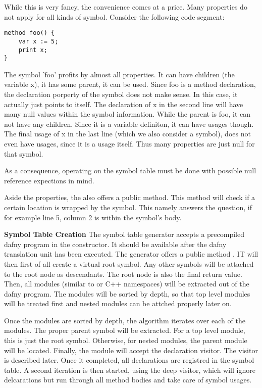 While this is very fancy, the convenience comes at a price. Many properties do not apply for all kinds of symbol. Consider the following code segment:

\begin{lstlisting}[language=dafny, caption={Example Code Regarding Symbol Information}, captionpos=b, label={lst:aldbkajds}]
method foo() {
    var x := 5;
    print x;
}
\end{lstlisting}

The symbol 'foo' profits by almost all properties. It can have children (the variable x), it has some parent, it can be used. Since foo is a method declaration, the declaration porperty of the symbol does not make sense. In this case, it actually just points to itself. The declaration of x in the second line will have many null values within the symbol information. While the parent is foo, it can not have any children. Since it is a variable definiton, it can have usages though. The final usage of x in the last line (which we also consider a symbol), does not even have usages, since it is a usage itself. Thus many properties are just null for that symbol.

As a consequence, operating on the symbol table must be done with possible null reference expections in mind.

Aside the properties, the  also offers a public method. This method will check if a certain location is wrapped by the symbol. This namely answers the question, if for example line 5, column 2 is within the symbol's body.

\textbf{Symbol Table Creation}
The symbol table generator accepts a precompiled dafny program in the constructor. It should be available after the dafny translation unit has been executed. The generator offers a public method . IT will then first of all create a virtual root symbol. Any other symbols will be attached to the root node as descendants. The root node is also the final return value.\\

Then, all modules (similar to \Csharp or C++ namespaces) will be extracted out of the dafny program. The modules will be sorted by depth, so that top level modules will be treated first and nested modules can be attched properly later on.

Once the modules are sorted by depth, the algorithm iterates over each of the modules. The proper parent symbol will be extracted. For a top level module, this is just the root symbol. Otherwise, for nested modules, the parent module will be located. Finally, the module will accept the declaration visitor. The visitor is described later. Once it completed, all declarations are registred in the symbol table. A second iteration is then started, using the deep visitor, which will ignore delcarations but run through all method bodies and take care of symbol usages.

